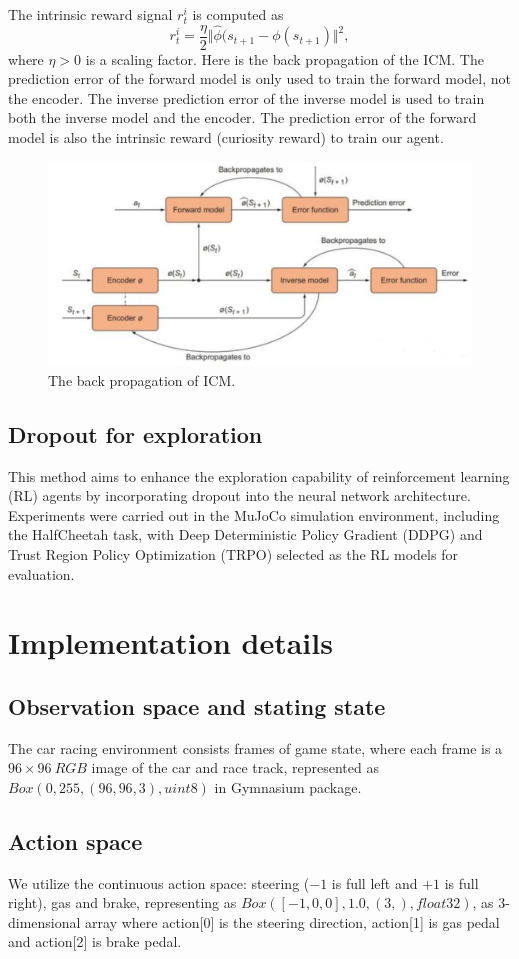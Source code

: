 \documentclass{article}
\begin{document}
The intrinsic reward signal $r_t^i$ is computed as 
\[
r_t^i = \frac{\eta}{2}\Vert\hat{\phi}(s_{t+1}-\phi(s_{t+1})\Vert^2,
\] where $\eta>0$ is a scaling factor.
Here is the back propagation of the ICM. The prediction error of the forward model is only used to train the forward model, not the encoder. The inverse prediction error of the inverse model is used to train both the inverse model and the encoder. The prediction error of the forward model is also the intrinsic reward (curiosity reward) to train our agent.
\begin{figure}[!ht]
	\centering
	\includegraphics[width=0.5\linewidth]{figure/BackPropagation.png}
	\caption{The back propagation of ICM.}
	\label{fig:enter-label}
\end{figure}


\subsection{Dropout for exploration}
This method aims to enhance the exploration capability of reinforcement learning (RL) agents by incorporating dropout into the neural network architecture. Experiments were carried out in the MuJoCo simulation environment, including the HalfCheetah task, with Deep Deterministic Policy Gradient (DDPG) and Trust Region Policy Optimization (TRPO) selected as the RL models for evaluation.


\section{Implementation details}
\subsection{Observation space and stating state}
The car racing environment consists frames of game state, where each frame is a $96\times 96\ RGB$ image of the car and race track, represented as $Box(0,255,(96,96,3),uint8)$ in Gymnasium package.

\subsection{Action space}
We utilize the continuous action space: steering ($-1$ is full left and $+1$ is full right), gas and brake, representing as $Box([-1,0,0],1.0,(3,),float32)$, as 3-dimensional array where action[0] is the steering direction, action[1] is gas pedal and action[2] is brake pedal.
\end{document}
